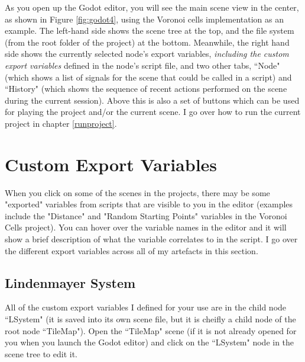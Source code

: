 As you open up the Godot editor, you will see the main scene view in the center, as shown in Figure \ref{fig:godot4}, using the Voronoi cells implementation as an example. The left-hand side shows the scene tree at the top, and the file system (from the root folder of the project) at the bottom. Meanwhile, the right hand side shows the currently selected node's export variables, \textit{including the custom export variables} defined in the node's script file, and two other tabs, ``Node" (which shows a list of signals for the scene that could be called in a script) and ``History" (which shows the sequence of recent actions performed on the scene during the current session). Above this is also a set of buttons which can be used for playing the project and/or the current scene. I go over how to run the current project in chapter \ref{runproject}.

\section{Custom Export Variables} 

When you click on some of the scenes in the projects, there may be some "exported" variables from scripts that are visible to you in the editor (examples include the "Distance" and "Random Starting Points" variables in the Voronoi Cells project). You can hover over the variable names in the editor and it will show a brief description of what the variable correlates to in the script. I go over the different export variables across all of my artefacts in this section.

\subsection{Lindenmayer System}

All of the custom export variables I defined for your use are in the child node ``LSystem" (it is saved into its own scene file, but it is cheifly a child node of the root node ``TileMap"). Open the ``TileMap" scene (if it is not already opened for you when you launch the Godot editor) and click on the ``LSystem" node in the scene tree to edit it.

